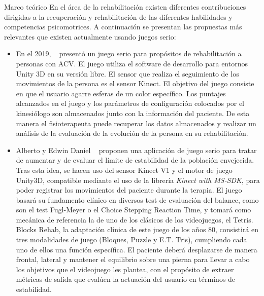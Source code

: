 \begin{thesischapter}{1} {Marco teórico}
    \vspace{10pt}
    En el área de la rehabilitación %
    existen diferentes contribuciones dirigidas a la recuperación y rehabilitación de las diferentes habilidades y competencias psicomotrices. 
    A continuación se presentan las propuestas más relevantes que existen actualmente usando juegos serio:
    \begin{itemize}
        \item En el 2019, ~\cite{rodriguez2019design} presentó un juego serio para propósitos de rehabilitación a personas con ACV. El juego utiliza el software de desarrollo para entornos Unity 3D en su versión libre. El sensor que realiza el seguimiento de los movimientos de la persona es el sensor Kinect. El objetivo del juego consiste en que el usuario agarre esferas de un color específico. Los puntajes alcanzados en el juego y los parámetros de configuración colocados por el kinesiólogo son almacenados junto con la información del paciente. De esta manera el fisioterapeuta puede recuperar los datos almacenados y realizar un análisis de la evaluación de la evolución de la persona en su rehabilitación. 
        \item Alberto y Edwin Daniel ~\cite{morales2019desarrollo} proponen una aplicación de juego serio para tratar de aumentar y de evaluar el límite de estabilidad de la población envejecida. Tras esta idea, se hacen uso del sensor Kinect V1 y el motor de juego Unity3D, compatible mediante el uso de la librería \textit{Kinect with MS-SDK}, para poder registrar los movimientos del paciente durante la terapia. El juego basará su fundamento clínico en diversos test de evaluación del balance, como son el test Fugl-Meyer o el Choice Stepping Reaction Time, y tomará como mecánica de referencia la de uno de los clásicos de los videojuegos, el Tetris. Blocks Rehab, la adaptación clínica de este juego de los años 80, consistirá en tres modalidades de juego (Bloques, Puzzle y E.T. Tris), cumpliendo cada uno de ellos una función específica. El paciente deberá desplazarse de manera frontal, lateral y mantener el equilibrio sobre una pierna para llevar a cabo los objetivos que el videojuego les plantea, con el propósito de extraer métricas de salida que evalúen la actuación del usuario en términos de estabilidad. 

\end{itemize}
\end{thesischapter}
